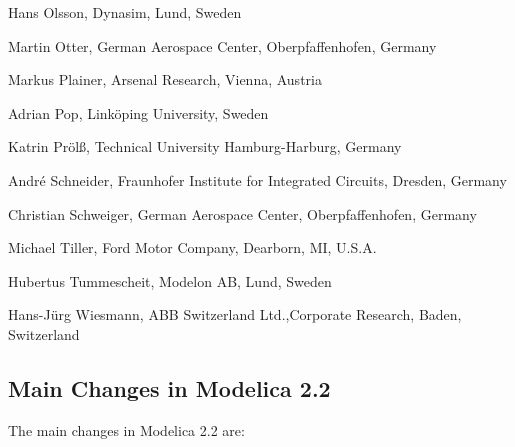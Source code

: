 \documentclass[10pt,a4paper]{report}
\def\doublelabel#1{\label{#1}\hypertarget{#1}{}}
\begin{document}
Hans Olsson, Dynasim, Lund, Sweden

Martin Otter, German Aerospace Center, Oberpfaffenhofen, Germany

Markus Plainer, Arsenal Research, Vienna, Austria

Adrian Pop, Linköping University, Sweden

Katrin Prölß, Technical University Hamburg-Harburg, Germany

André Schneider, Fraunhofer Institute for Integrated Circuits, Dresden,
Germany

Christian Schweiger, German Aerospace Center, Oberpfaffenhofen, Germany

Michael Tiller, Ford Motor Company, Dearborn, MI, U.S.A.

Hubertus Tummescheit, Modelon AB, Lund, Sweden

Hans-Jürg Wiesmann, ABB Switzerland Ltd.,Corporate Research, Baden,
Switzerland

\subsection{Main Changes in Modelica 2.2}\doublelabel{main-changes-in-modelica-2-2}

The main changes in Modelica 2.2 are:
\end{document}

